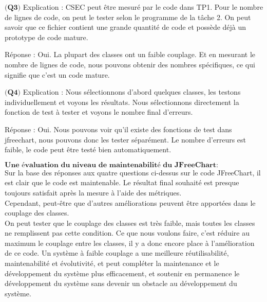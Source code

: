 \documentclass{article}
\begin{document}
\item$\textbf{(Q3)}$
Explication : CSEC peut être mesuré par le code dans TP1. Pour le nombre de lignes de code, on peut le tester selon le programme de la tâche 2. On peut savoir que ce fichier contient une grande quantité de code et possède déjà un prototype de code mature.

Réponse : Oui. La plupart des classes ont un faible couplage. Et en mesurant le nombre de lignes de code, nous pouvons obtenir des nombres spécifiques, ce qui signifie que c'est un code mature.

\item$\textbf{(Q4)}$
Explication : Nous sélectionnons d'abord quelques classes, les testons individuellement et voyons les résultats. Nous sélectionnons directement la fonction de test à tester et voyons le nombre final d'erreurs.

Réponse : Oui. Nous pouvons voir qu'il existe des fonctions de test dans jfreechart, nous pouvons donc les tester séparément. Le nombre d'erreurs est faible, le code peut être testé bien automatiquement.\\


\item$\textbf{Une évaluation du niveau de maintenabilité du JFreeChart:}$\\
Sur la base des réponses aux quatre questions ci-dessus sur le code JFreeChart, il est clair que le code est  maintenable. Le résultat final souhaité est presque toujours satisfait après la mesure à l'aide des métriques.\\
Cependant, peut-être que d'autres améliorations peuvent être apportées dans le couplage des classes.\\
On peut tester que le couplage des classes est très faible, mais toutes les classes ne remplissent pas cette condition. Ce que nous voulons faire, c'est réduire au maximum le couplage entre les classes, il y a donc encore place à l'amélioration de ce code. Un système à faible couplage a une meilleure réutilisabilité, maintenabilité et évolutivité, et peut compléter la maintenance et le développement du système plus efficacement, et soutenir en permanence le développement du système sans devenir un obstacle au développement du système.
\end{document}
